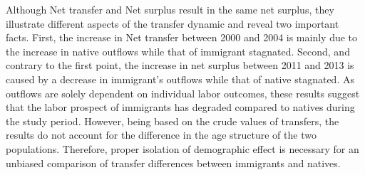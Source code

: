  \vspace{0.7em}\par
  Although Net transfer and Net surplus result in the same net surplus, they illustrate different aspects of the transfer dynamic and reveal two important facts.
First, the increase in Net transfer between 2000 and 2004 is mainly due to the increase in native outflows while that of immigrant stagnated.
Second, and contrary to the first point, the increase in net surplus between 2011 and 2013 is caused by a decrease in immigrant's outflows while that of native stagnated.
As outflows are solely dependent on individual labor outcomes, these results suggest that the labor prospect of immigrants has degraded compared to natives during the study period.
However, being based on the crude values of transfers, the results do not account for the difference in the age structure of the two populations.
Therefore, proper isolation of demographic effect is necessary for an unbiased comparison of transfer differences between immigrants and natives.















